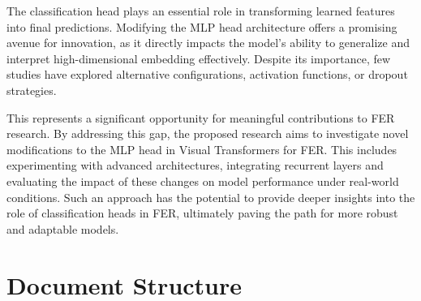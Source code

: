 The classification head plays an essential role in transforming learned features into final predictions. Modifying the MLP head architecture offers a promising avenue for innovation, as it directly impacts the model’s ability to generalize and interpret high-dimensional embedding effectively. 
Despite its importance, few studies have explored alternative configurations, activation functions, or dropout strategies.

This represents a significant opportunity for meaningful contributions to FER research. By addressing this gap, the proposed research aims to investigate novel modifications to the MLP head in Visual Transformers for FER. This includes experimenting with advanced architectures, integrating recurrent layers and evaluating the impact of these changes on model performance under real-world conditions. Such an approach has
the potential to provide deeper insights into the role of classification heads in FER, ultimately paving the path for more robust and adaptable models.

\section{Document Structure}
%
%
%
%
%
%


